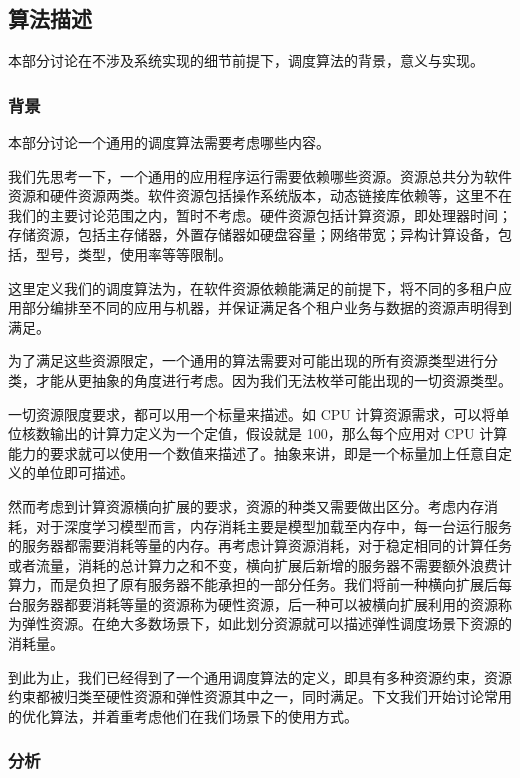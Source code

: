 \subsection{算法描述}

本部分讨论在不涉及系统实现的细节前提下，调度算法的背景，意义与实现。

\subsubsection{背景}

本部分讨论一个通用的调度算法需要考虑哪些内容。

我们先思考一下，一个通用的应用程序运行需要依赖哪些资源。资源总共分为软件资源和硬件资源两类。软件资源包括操作系统版本，动态链接库依赖等，这里不在我们的主要讨论范围之内，暂时不考虑。硬件资源包括计算资源，即处理器时间；存储资源，包括主存储器，外置存储器如硬盘容量；网络带宽；异构计算设备，包括，型号，类型，使用率等等限制。

这里定义我们的调度算法为，在软件资源依赖能满足的前提下，将不同的多租户应用部分编排至不同的应用与机器，并保证满足各个租户业务与数据的资源声明得到满足。

为了满足这些资源限定，一个通用的算法需要对可能出现的所有资源类型进行分类，才能从更抽象的角度进行考虑。因为我们无法枚举可能出现的一切资源类型。

一切资源限度要求，都可以用一个标量来描述。如 CPU 计算资源需求，可以将单位核数输出的计算力定义为一个定值，假设就是 100，那么每个应用对 CPU 计算能力的要求就可以使用一个数值来描述了。抽象来讲，即是一个标量加上任意自定义的单位即可描述。

然而考虑到计算资源横向扩展的要求，资源的种类又需要做出区分。考虑内存消耗，对于深度学习模型而言，内存消耗主要是模型加载至内存中，每一台运行服务的服务器都需要消耗等量的内存。再考虑计算资源消耗，对于稳定相同的计算任务或者流量，消耗的总计算力之和不变，横向扩展后新增的服务器不需要额外浪费计算力，而是负担了原有服务器不能承担的一部分任务。我们将前一种横向扩展后每台服务器都要消耗等量的资源称为硬性资源，后一种可以被横向扩展利用的资源称为弹性资源。在绝大多数场景下，如此划分资源就可以描述弹性调度场景下资源的消耗量。

到此为止，我们已经得到了一个通用调度算法的定义，即具有多种资源约束，资源约束都被归类至硬性资源和弹性资源其中之一，同时满足。下文我们开始讨论常用的优化算法，并着重考虑他们在我们场景下的使用方式。

\subsubsection{分析}

